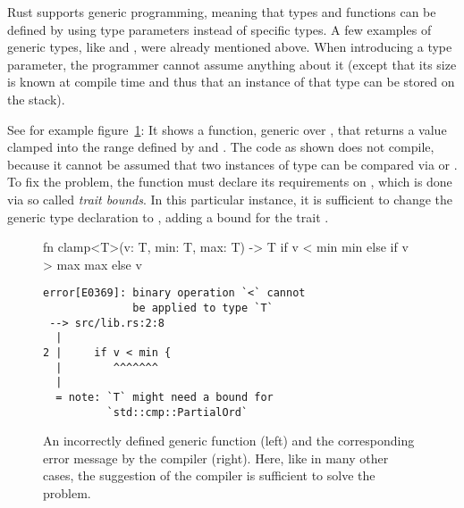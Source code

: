 Rust supports generic programming, meaning that types and functions can be defined by using type parameters instead of specific types.
A few examples of generic types, like  and , were already mentioned above.
When introducing a type parameter, the programmer cannot assume anything about it (except that its size is known at compile time and thus that an instance of that type can be stored on the stack).

See for example figure~\ref{fig:clamp}:
It shows a function, generic over , that returns a value clamped into the range defined by  and .
The code as shown does not compile, because it cannot be assumed that two instances of type  can be compared via \code{<} or \code{>}.
To fix the problem, the function must declare its requirements on , which is done via so called \emph{trait bounds}.
In this particular instance, it is sufficient to change the generic type declaration to , adding a bound for the trait .

\vspace{6mm}
\begin{figure}[h]
  \centering
  \begin{minipage}[t]{.55\textwidth}
    \begin{rustcode}
      fn clamp<T>(v: T, min: T, max: T) -> T {
          if v < min {
              min
          } else if v > max {
              max
          } else {
              v
          }
      }
    \end{rustcode}
  \end{minipage}
  \hspace{2mm}
  \begin{minipage}[t]{.42\textwidth}
    \footnotesize
    \vspace{3mm}
    \begin{verbatim}
error[E0369]: binary operation `<` cannot
              be applied to type `T`
 --> src/lib.rs:2:8
  |
2 |     if v < min {
  |        ^^^^^^^
  |
  = note: `T` might need a bound for
          `std::cmp::PartialOrd`
    \end{verbatim}
  \end{minipage}
  \caption{
    An incorrectly defined generic function (left) and the corresponding error message by the compiler (right).
    Here, like in many other cases, the suggestion of the compiler is sufficient to solve the problem.
  }
  \label{fig:clamp}
\end{figure}
\vspace{6mm}

